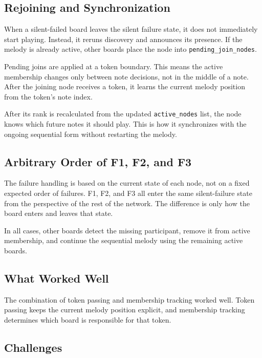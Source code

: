 \documentclass[11pt,a4paper]{article}
\begin{document}
\subsection*{Rejoining and Synchronization}

When a silent-failed board leaves the silent failure state, it does not immediately start playing. Instead, it reruns discovery and announces its presence. If the melody is already active, other boards place the node into \texttt{pending\_\allowbreak{}join\_\allowbreak{}nodes}.

Pending joins are applied at a token boundary. This means the active membership changes only between note decisions, not in the middle of a note. After the joining node receives a token, it learns the current melody position from the token's note index.

After its rank is recalculated from the updated \texttt{active\_\allowbreak{}nodes} list, the node knows which future notes it should play. This is how it synchronizes with the ongoing sequential form without restarting the melody.

\subsection*{Arbitrary Order of F1, F2, and F3}

The failure handling is based on the current state of each node, not on a fixed expected order of failures. F1, F2, and F3 all enter the same silent-failure state from the perspective of the rest of the network. The difference is only how the board enters and leaves that state.

In all cases, other boards detect the missing participant, remove it from active membership, and continue the sequential melody using the remaining active boards.

\subsection*{What Worked Well}

The combination of token passing and membership tracking worked well. Token passing keeps the current melody position explicit, and membership tracking determines which board is responsible for that token.

\subsection*{Challenges}
\end{document}
